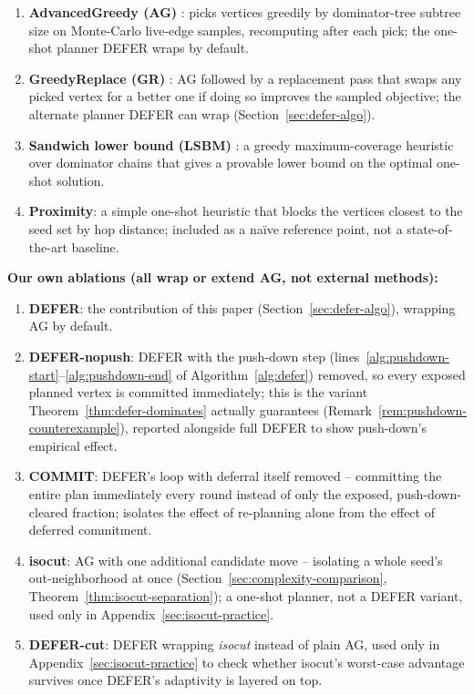 \documentclass[preprint,11pt]{elsarticle}
\theoremstyle{definition}
\theoremstyle{remark}
\begin{document}
\begin{enumerate}
\item \textbf{AdvancedGreedy (AG)} \citep{xie2023,xie2024}: picks vertices
  greedily by dominator-tree subtree size on Monte-Carlo live-edge
  samples, recomputing after each pick; the one-shot planner DEFER wraps
  by default.
\item \textbf{GreedyReplace (GR)} \citep{xie2023,xie2024}: AG followed by a
  replacement pass that swaps any picked vertex for a better one if doing
  so improves the sampled objective; the alternate planner DEFER can wrap
  (Section~\ref{sec:defer-algo}).
\item \textbf{Sandwich lower bound (LSBM)} \citep{wang2024sandwich}: a
  greedy maximum-coverage heuristic over dominator chains that gives a
  provable lower bound on the optimal one-shot solution.
\item \textbf{Proximity}: a simple one-shot heuristic that blocks the
  vertices closest to the seed set by hop distance; included as a
  na\"ive reference point, not a state-of-the-art baseline.
\end{enumerate}

\noindent\textbf{Our own ablations (all wrap or extend AG, not external
methods):}

\begin{enumerate}
\item \textbf{DEFER}: the contribution of this paper (Section~\ref{sec:defer-algo}),
  wrapping AG by default.
\item \textbf{DEFER-nopush}: DEFER with the push-down step
  (lines~\ref{alg:pushdown-start}--\ref{alg:pushdown-end} of
  Algorithm~\ref{alg:defer}) removed, so every exposed planned vertex is
  committed immediately; this is the variant Theorem~\ref{thm:defer-dominates}
  actually guarantees (Remark~\ref{rem:pushdown-counterexample}), reported
  alongside full DEFER to show push-down's empirical effect.
\item \textbf{COMMIT}: DEFER's loop with deferral itself removed --
  committing the entire plan immediately every round instead of only the
  exposed, push-down-cleared fraction; isolates the effect of re-planning
  alone from the effect of deferred commitment.
\item \textbf{isocut}: AG with one additional candidate move -- isolating
  a whole seed's out-neighborhood at once
  (Section~\ref{sec:complexity-comparison}, Theorem~\ref{thm:isocut-separation});
  a one-shot planner, not a DEFER variant, used only in
  Appendix~\ref{sec:isocut-practice}.
\item \textbf{DEFER-cut}: DEFER wrapping \emph{isocut} instead of plain
  AG, used only in Appendix~\ref{sec:isocut-practice} to check
  whether isocut's worst-case advantage survives once DEFER's adaptivity
  is layered on top.
\end{enumerate}
\end{document}
